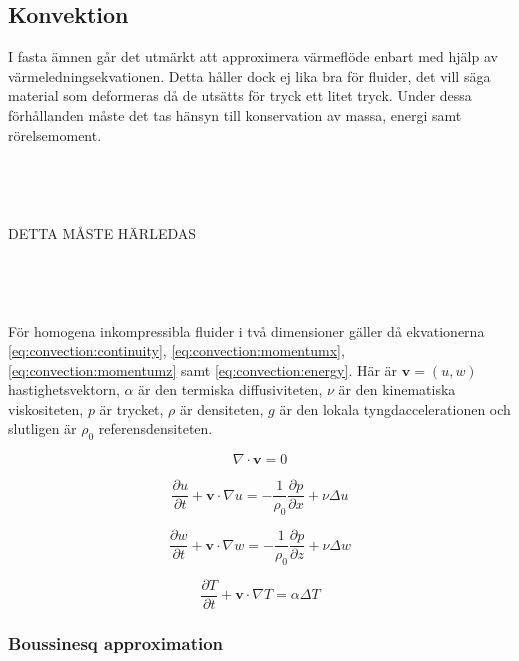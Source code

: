 \subsection{Konvektion}
\label{section:convection}
I fasta ämnen går det utmärkt att approximera värmeflöde enbart med hjälp
av värmeledningsekvationen. Detta håller dock ej lika bra för fluider, det vill säga
material som deformeras då de utsätts för tryck ett litet tryck.
Under dessa förhållanden
måste det tas hänsyn till konservation av massa, energi samt rörelsemoment.
\\\\\\\\\\
DETTA MÅSTE HÄRLEDAS
\\\\\\\\\\

För homogena inkompressibla fluider i två dimensioner gäller då ekvationerna
\eqref{eq:convection:continuity}, \eqref{eq:convection:momentumx},
\eqref{eq:convection:momentumz} samt \eqref{eq:convection:energy}. Här
är $\mathbf{v} = (u,w)$ hastighetsvektorn, $\alpha$ är den termiska
diffusiviteten, $\nu$ är den kinematiska viskositeten, $p$ är trycket,
$\rho$ är densiteten, $g$ är den lokala tyngdaccelerationen
och slutligen är $\rho_0$ referensdensiteten.

\begin{equation}
\label{eq:convection:continuity}
\nabla\cdot\mathbf{v} = 0
\end{equation}

\begin{equation}
\label{eq:convection:momentumx}
\frac{\partial u}{\partial t} + \mathbf{v}\cdot\nabla u = 
-\frac{1}{\rho_0}\frac{\partial p}{\partial x} + 
\nu\Delta u
\end{equation}

\begin{equation}
\label{eq:convection:momentumz}
\frac{\partial w}{\partial t} + \mathbf{v}\cdot\nabla w = 
-\frac{1}{\rho_0}\frac{\partial p}{\partial z} + \nu\Delta w
\end{equation}

\begin{equation}
\label{eq:convection:energy}
\frac{\partial T}{\partial t} + \mathbf{v}\cdot\nabla T = \alpha\Delta T
\end{equation}

\subsubsection{Boussinesq approximation}

